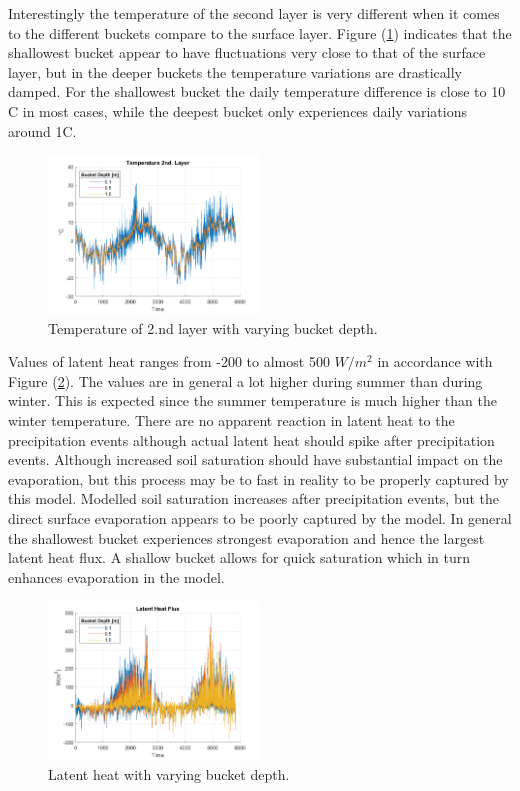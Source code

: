 \documentclass[a4paper,11pt,twocolumn]{article}
\begin{document}
Interestingly the temperature of the second layer is very different when it comes to the different buckets compare to the surface layer. Figure (\ref{fig:t2}) indicates that the shallowest bucket appear to have fluctuations very close to that of the surface layer, but in the deeper buckets the temperature variations are drastically damped. For the shallowest bucket the daily temperature difference is close to 10 \textdegree C in most cases, while the deepest bucket only experiences daily variations around 1\textdegree C.     

\begin{figure}[h]
	\centering 
	\includegraphics[width=0.5\textwidth]{figures/t_ground}
	\caption{Temperature of 2.nd layer with varying bucket depth.}
	\label{fig:t2}
\end{figure} 


Values of latent heat ranges from -200 to almost 500 $W/m^2$ in accordance with Figure (\ref{fig:latent}). The values are in general a lot higher during summer than during winter. This is expected since the summer temperature is much higher than the winter temperature. There are no apparent reaction in latent heat to the precipitation events although actual latent heat should spike after precipitation events. Although increased soil saturation should have substantial impact on the evaporation, but this process may be to fast in reality to be properly captured by this model. Modelled soil saturation increases after precipitation events, but the direct surface evaporation appears to be poorly captured by the model. In general the shallowest bucket experiences strongest evaporation and hence the largest latent heat flux. A shallow bucket allows for quick saturation which in turn enhances evaporation in the model.

\begin{figure}[h]
	\centering 
	\includegraphics[width=0.5\textwidth]{figures/latent_heat}
	\caption{Latent heat with varying bucket depth.}
	\label{fig:latent}
\end{figure} 
\end{document}
